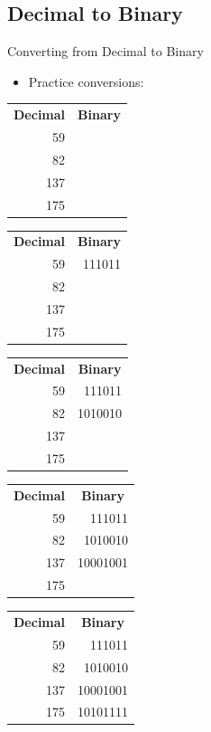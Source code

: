 \documentclass[graphics]{beamer}
\newcommand*{\thead}[1]{\multicolumn{1}{c}{\bfseries #1}}
\begin{document}
\subsection{Decimal to Binary}
\begin{frame}{Converting from Decimal to Binary}
    \begin{itemize}
        \item Practice conversions:
    \end{itemize}
    \centering
     {
        \begin{tabular}{r r}
            \thead{Decimal} & \thead{Binary} \\
             59  & \\
             82  & \\
             137 & \\
             175 &
        \end{tabular}
    }
     {
        \begin{tabular}{r r}
            \thead{Decimal} & \thead{Binary} \\
             59  & 111011 \\
             82  & \\
             137 & \\
             175 &
        \end{tabular}
    }
     {
        \begin{tabular}{r r}
            \thead{Decimal} & \thead{Binary} \\
             59  & 111011 \\
             82  & 1010010 \\
             137 & \\
             175 &
        \end{tabular}
    }
     {
        \begin{tabular}{r r}
            \thead{Decimal} & \thead{Binary} \\
             59  & 111011 \\
             82  & 1010010 \\
             137 & 10001001 \\
             175 &
        \end{tabular}
    }
     {
        \begin{tabular}{r r}
            \thead{Decimal} & \thead{Binary} \\
             59  & 111011 \\
             82  & 1010010 \\
             137 & 10001001 \\
             175 & 10101111
        \end{tabular}
    }
\end{frame}
\end{document}

